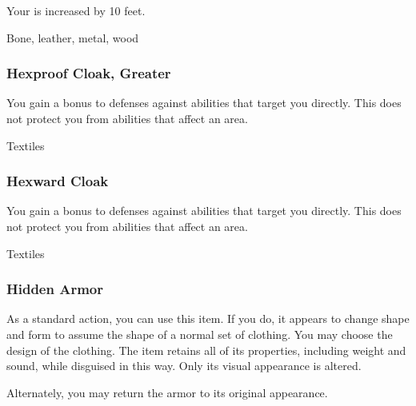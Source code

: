 Your  is increased by 10 feet.



 Bone, leather, metal, wood


\lowercase{\hypertarget{item:Hexproof Cloak, Greater}{}}\label{item:Hexproof Cloak, Greater}
\hypertarget{item:Hexproof Cloak, Greater}{\subsubsection{Hexproof Cloak, Greater\hfill{}}}

You gain a  bonus to defenses against  abilities that target you directly.
This does not protect you from abilities that affect an area.



 


 Textiles


\lowercase{\hypertarget{item:Hexward Cloak}{}}\label{item:Hexward Cloak}
\hypertarget{item:Hexward Cloak}{\subsubsection{Hexward Cloak\hfill{}}}

You gain a  bonus to defenses against  abilities that target you directly.
This does not protect you from abilities that affect an area.



 


 Textiles


\lowercase{\hypertarget{item:Hidden Armor}{}}\label{item:Hidden Armor}
\hypertarget{item:Hidden Armor}{\subsubsection{Hidden Armor\hfill{}}}

As a standard action, you can use this item.
If you do, it appears to change shape and form to assume the shape of a normal set of clothing.
You may choose the design of the clothing.
The item retains all of its properties, including weight and sound, while disguised in this way.
Only its visual appearance is altered.

Alternately, you may return the armor to its original appearance.



